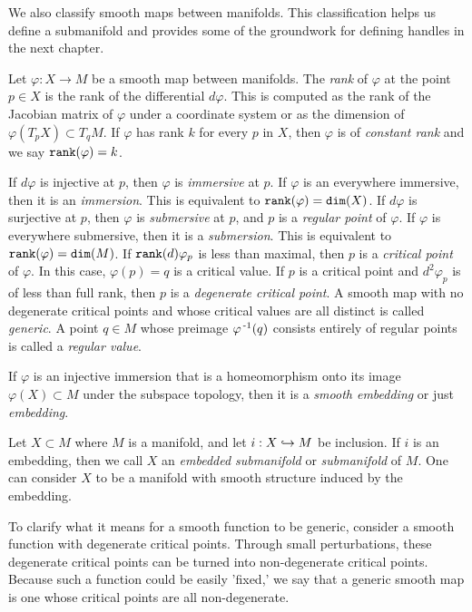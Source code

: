 We also classify smooth maps between manifolds.
This classification helps us define a submanifold and provides some of the groundwork for defining handles in the next chapter.

\begin{defn}[Embedding]
	Let $\varphi:X\to M$ be a smooth map between manifolds.
	The \emph{rank} of $\varphi$ at the point $p\in X$ is the rank of the differential $d\varphi$.
	This is computed as the rank of the Jacobian matrix of $\varphi$ under a coordinate system or as the dimension of $\varphi(T_p X)\subset T_q M$.
	If $\varphi$ has rank $k$ for every $p$ in $X$, then $\varphi$ is of \emph{constant rank} and we say $\texttt{rank}(\varphi)=k$.
	 
	If $d\varphi$ is injective at $p$, then $\varphi$ is \emph{immersive} at $p$.
	If $\varphi$ is an everywhere immersive, then it is an \emph{immersion}.
	This is equivalent to $\texttt{rank}(\varphi)=\texttt{dim}(X)$.
	If $d\varphi$ is surjective at $p$, then $\varphi$ is \emph{submersive} at $p$, and $p$ is a \emph{regular point} of $\varphi$.
	If $\varphi$ is everywhere submersive, then it is a \emph{submersion}.
	This is equivalent to $\texttt{rank}(\varphi)=\texttt{dim}(M)$.
	If $\texttt{rank}(d)\varphi_p$ is less than maximal, then $p$ is a \emph{critical point} of $\varphi$.
	In this case, $\varphi(p)=q$ is a critical value.
	If $p$ is a critical point and $d^2\varphi_p$ is of less than full rank, then $p$ is a \emph{degenerate critical point}.
	A smooth map with no degenerate critical points and whose critical values are all distinct is called \emph{generic}.
	A point $q\in M$ whose preimage $\varphi^{\,\text{-}1}(q)$ consists entirely of regular points is called a \emph{regular value}.
	
	If $\varphi$ is an injective immersion that is a homeomorphism onto its image $\varphi(X)\subset M$ under the subspace topology, then it is a \emph{smooth embedding} or just \emph{embedding}.
	
	Let $X\subset M$ where $M$ is a manifold, and let $i:X\hookrightarrow M$ be inclusion.
	If $i$ is an embedding, then we call $X$ an \emph{embedded submanifold} or \emph{submanifold} of $M$.
	One can consider $X$ to be a manifold with smooth structure induced by the embedding.
\end{defn}

To clarify what it means for a smooth function to be generic, consider a smooth function with degenerate critical points.
Through small perturbations, these degenerate critical points can be turned into non-degenerate critical points.
Because such a function could be easily 'fixed,' we say that a generic smooth map is one whose critical points are all non-degenerate.

